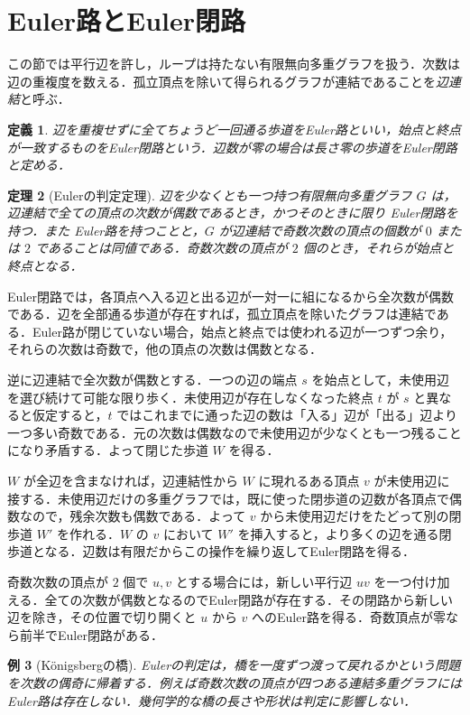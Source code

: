 \documentclass[a5paper,10pt,onecolumn]{jsarticle}
\makeatletter
\theoremstyle{mathnotetheorem}
\newtheorem{theorem}{定理}[section]
\newtheorem{definition}[theorem]{定義}
\newtheorem{example}[theorem]{例}
\renewcommand{\proofname}{証明}
\renewenvironment{proof}[1][\proofname]{%
  \par\pushQED{\qed}\normalfont\topsep4\p@\@plus2\p@\relax
  \trivlist\item[\hskip\labelsep\bfseries #1]\ignorespaces
}{\popQED\endtrivlist\@endpefalse}
\makeatother
\begin{document}
\section{Euler路とEuler閉路}
この節では平行辺を許し，ループは持たない有限無向多重グラフを扱う．次数は辺の重複度を数える．孤立頂点を除いて得られるグラフが連結であることを\emph{辺連結}と呼ぶ．
\begin{definition}
辺を重複せずに全てちょうど一回通る歩道を\emph{Euler路}といい，始点と終点が一致するものを\emph{Euler閉路}という．辺数が零の場合は長さ零の歩道をEuler閉路と定める．
\end{definition}
\begin{theorem}[Eulerの判定定理]\label{thm:euler}
辺を少なくとも一つ持つ有限無向多重グラフ $G$ は，辺連結で全ての頂点の次数が偶数であるとき，かつそのときに限り Euler閉路を持つ．また Euler路を持つことと，$G$ が辺連結で奇数次数の頂点の個数が $0$ または $2$ であることは同値である．奇数次数の頂点が $2$ 個のとき，それらが始点と終点となる．
\end{theorem}
\begin{proof}
Euler閉路では，各頂点へ入る辺と出る辺が一対一に組になるから全次数が偶数である．辺を全部通る歩道が存在すれば，孤立頂点を除いたグラフは連結である．Euler路が閉じていない場合，始点と終点では使われる辺が一つずつ余り，それらの次数は奇数で，他の頂点の次数は偶数となる．

逆に辺連結で全次数が偶数とする．一つの辺の端点 $s$ を始点として，未使用辺を選び続けて可能な限り歩く．未使用辺が存在しなくなった終点 $t$ が $s$ と異なると仮定すると，$t$ ではこれまでに通った辺の数は「入る」辺が「出る」辺より一つ多い奇数である．元の次数は偶数なので未使用辺が少なくとも一つ残ることになり矛盾する．よって閉じた歩道 $W$ を得る．

$W$ が全辺を含まなければ，辺連結性から $W$ に現れるある頂点 $v$ が未使用辺に接する．未使用辺だけの多重グラフでは，既に使った閉歩道の辺数が各頂点で偶数なので，残余次数も偶数である．よって $v$ から未使用辺だけをたどって別の閉歩道 $W'$ を作れる．$W$ の $v$ において $W'$ を挿入すると，より多くの辺を通る閉歩道となる．辺数は有限だからこの操作を繰り返してEuler閉路を得る．

奇数次数の頂点が $2$ 個で $u,v$ とする場合には，新しい平行辺 $uv$ を一つ付け加える．全ての次数が偶数となるのでEuler閉路が存在する．その閉路から新しい辺を除き，その位置で切り開くと $u$ から $v$ へのEuler路を得る．奇数頂点が零なら前半でEuler閉路がある．
\end{proof}

\begin{example}[K\"onigsbergの橋]
Eulerの判定は，橋を一度ずつ渡って戻れるかという問題を次数の偶奇に帰着する．例えば奇数次数の頂点が四つある連結多重グラフにはEuler路は存在しない．幾何学的な橋の長さや形状は判定に影響しない．
\end{example}
\end{document}
